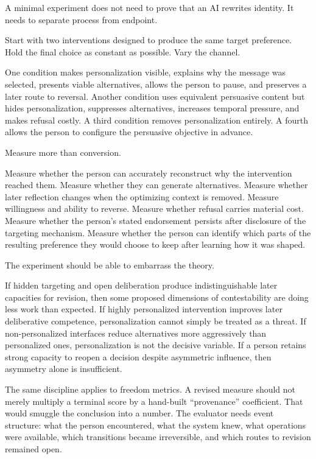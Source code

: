 \documentclass[
  10.5pt,
  letterpaper,
]{article}
\begin{document}
A minimal experiment does not need to prove that an AI rewrites
identity. It needs to separate process from endpoint.

Start with two interventions designed to produce the same target
preference. Hold the final choice as constant as possible. Vary the
channel.

One condition makes personalization visible, explains why the message
was selected, presents viable alternatives, allows the person to pause,
and preserves a later route to reversal. Another condition uses
equivalent persuasive content but hides personalization, suppresses
alternatives, increases temporal pressure, and makes refusal costly. A
third condition removes personalization entirely. A fourth allows the
person to configure the persuasive objective in advance.

Measure more than conversion.

Measure whether the person can accurately reconstruct why the
intervention reached them. Measure whether they can generate
alternatives. Measure whether later reflection changes when the
optimizing context is removed. Measure willingness and ability to
reverse. Measure whether refusal carries material cost. Measure whether
the person's stated endorsement persists after disclosure of the
targeting mechanism. Measure whether the person can identify which parts
of the resulting preference they would choose to keep after learning how
it was shaped.

The experiment should be able to embarrass the theory.

If hidden targeting and open deliberation produce indistinguishable
later capacities for revision, then some proposed dimensions of
contestability are doing less work than expected. If highly personalized
intervention improves later deliberative competence, personalization
cannot simply be treated as a threat. If non-personalized interfaces
reduce alternatives more aggressively than personalized ones,
personalization is not the decisive variable. If a person retains strong
capacity to reopen a decision despite asymmetric influence, then
asymmetry alone is insufficient.

The same discipline applies to freedom metrics. A revised measure should
not merely multiply a terminal score by a hand-built ``provenance''
coefficient. That would smuggle the conclusion into a number. The
evaluator needs event structure: what the person encountered, what the
system knew, what operations were available, which transitions became
irreversible, and which routes to revision remained open.
\end{document}
